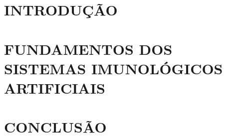\documentclass[12pt,a4paper,brazil,openany,oneside]{abntex2}
\begin{document}
\newpage
\pagestyle{empty} %
\tableofcontents

\chapter{\MakeUppercase{Introdução}}
\thispagestyle{mystyle}


\chapter{\MakeUppercase{Fundamentos dos Sistemas Imunológicos Artificiais}}
\thispagestyle{mystyle}


\chapter{\MakeUppercase{Conclusão}}
\thispagestyle{mystyle}



\end{document}
